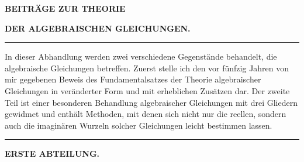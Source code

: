 \begin{center}
{\large\bfseries BEITRÄGE ZUR THEORIE\par}
\medskip
{\Large\bfseries DER ALGEBRAISCHEN GLEICHUNGEN.\par}
\medskip
\rule{0.18\linewidth}{0.4pt}
\end{center}

In dieser Abhandlung werden zwei verschiedene Gegenstände behandelt, die algebraische Gleichungen betreffen. Zuerst stelle ich den vor fünfzig Jahren von mir gegebenen Beweis des Fundamentalsatzes der Theorie algebraischer Gleichungen in veränderter Form und mit erheblichen Zusätzen dar. Der zweite Teil ist einer besonderen Behandlung algebraischer Gleichungen mit drei Gliedern gewidmet und enthält Methoden, mit denen sich nicht nur die reellen, sondern auch die imaginären Wurzeln solcher Gleichungen leicht bestimmen lassen.

\begin{center}
\rule{0.18\linewidth}{0.4pt}\par
\medskip
\textbf{ERSTE ABTEILUNG.}
\end{center}

